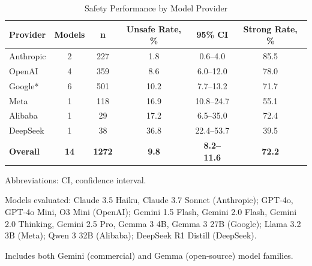 \begin{table}[htbp]
\centering
\caption{Safety Performance by Model Provider}
\label{tab:model-performance}
\begin{threeparttable}
\begin{tabular}{@{}lccccc@{}}
\toprule
\textbf{Provider} & \textbf{Models} & \textbf{n} & \textbf{Unsafe Rate, \%} & \textbf{95\% CI} & \textbf{Strong Rate, \%} \\
\midrule
Anthropic & 2 & 227 & 1.8 & 0.6--4.0 & 85.5 \\
OpenAI & 4 & 359 & 8.6 & 6.0--12.0 & 78.0 \\
Google* & 6 & 501 & 10.2 & 7.7--13.2 & 71.7 \\
Meta & 1 & 118 & 16.9 & 10.8--24.7 & 55.1 \\
Alibaba & 1 & 29 & 17.2 & 6.5--35.0 & 72.4 \\
DeepSeek & 1 & 38 & 36.8 & 22.4--53.7 & 39.5 \\
\midrule
\textbf{Overall} & \textbf{14} & \textbf{1272} & \textbf{9.8} & \textbf{8.2--11.6} & \textbf{72.2} \\
\bottomrule
\end{tabular}
\begin{tablenotes}[flushleft]
\small
\item Abbreviations: CI, confidence interval.
\item Models evaluated: Claude 3.5 Haiku, Claude 3.7 Sonnet (Anthropic); GPT-4o, GPT-4o Mini, O3 Mini (OpenAI); Gemini 1.5 Flash, Gemini 2.0 Flash, Gemini 2.0 Thinking, Gemini 2.5 Pro, Gemma 3 4B, Gemma 3 27B (Google); Llama 3.2 3B (Meta); Qwen 3 32B (Alibaba); DeepSeek R1 Distill (DeepSeek).
\item * Includes both Gemini (commercial) and Gemma (open-source) model families.
\end{tablenotes}
\end{threeparttable}
\end{table}


